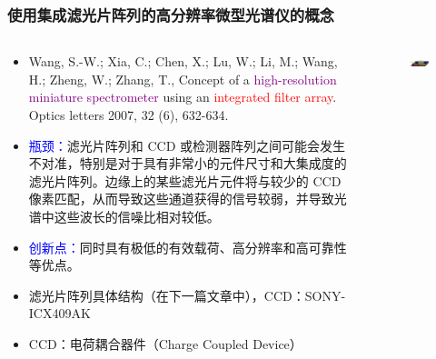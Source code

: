 \begin{frame}[c]
    \frametitle{使用集成滤光片阵列的高分辨率微型光谱仪的概念}
    \begin{columns}
        \begin{column}{.7\textwidth}
            \begin{itemize}
                \item Wang, S.-W.;  Xia, C.;  Chen, X.;  Lu, W.;  Li, M.;  Wang, H.;  Zheng, W.; Zhang, T., Concept of a \textcolor{purple}{high-resolution miniature spectrometer} using an \textcolor{red}{integrated filter array}. Optics letters 2007, 32 (6), 632-634.
                \item \textcolor{blue}{瓶颈：}滤光片阵列和 CCD 或检测器阵列之间可能会发生不对准，特别是对于具有非常小的元件尺寸和大集成度的滤光片阵列。边缘上的某些滤光片元件将与较少的 CCD 像素匹配，从而导致这些通道获得的信号较弱，并导致光谱中这些波长的信噪比相对较低。
                \item \textcolor{blue}{创新点：}同时具有极低的有效载荷、高分辨率和高可靠性等优点。
                \item 滤光片阵列具体结构（在下一篇文章中），CCD：SONY-ICX409AK
                \item \footnotesize{CCD：电荷耦合器件（Charge }Coupled Device）
            \end{itemize}
        \end{column}
        \begin{column}{.3\textwidth}
            \begin{figure}[H] %
                \centering %
                \includegraphics[width=1.\textwidth]{figures/Concept of a high-resolution miniature spectrometer using an integrated filter array_1.png} %
            \end{figure}
            \begin{figure}[H] %
                \centering %

\end{figure}
\end{column}
\end{columns}
\end{frame}
